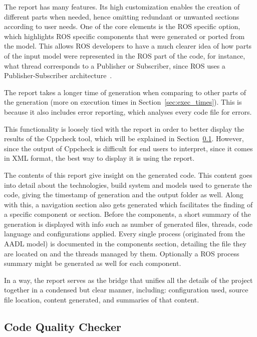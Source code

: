 The report has many features. Its high customization enables the creation of different parts when needed, hence omitting redundant or unwanted sections according to user needs. One of the core elements is the \gls{ROS} specific option, which highlights \gls{ROS} specific components that were generated or ported from the model. This allows \gls{ROS} developers to have a much clearer idea of how parts of the input model were represented in the \gls{ROS} part of the code, for instance, what thread corresponds to a Publisher or Subscriber, since \gls{ROS} uses a Publisher-Subscriber architecture~\cite{5645557}.

The report takes a longer time of generation when comparing to other parts of the generation (more on execution times in Section~\ref{sec:exec_times}). This is because it also includes error reporting, which analyses every code file for errors.

This functionality is loosely tied with the report in order to better display the results of the Cppcheck tool, which will be explained in Section~\ref{sec:impl_code_qual_checker}. However, since the output of Cppcheck is difficult for end users to interpret, since it comes in XML format, the best way to display it is using the report.

The contents of this report give insight on the generated code. This content goes into detail about the technologies, build system and models used to generate the code, giving the timestamp of generation and the output folder as well. Along with this, a navigation section also gets generated which facilitates the finding of a specific component or section. Before the components, a short summary of the generation is displayed with info such as number of generated files, threads, code language and configurations applied. Every single process (originated from the \gls{AADL} model) is documented in the components section, detailing the file they are located on and the threads managed by them. Optionally a \gls{ROS} process summary might be generated as well for each component. 

In a way, the report serves as the bridge that unifies all the details of the project together in a condensed but clear manner, including: configuration used, source file location, content generated, and summaries of that content.

\subsection{Code Quality Checker}
\label{sec:impl_code_qual_checker}

